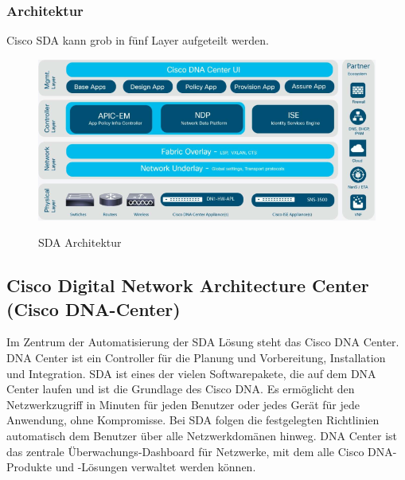 \subsubsection{Architektur}
Cisco SDA kann grob in fünf Layer aufgeteilt werden.
\begin{figure}[H]
	\centering
	\includegraphics[width=1\linewidth]{img/cisco-sda-architecture.png}\\[1px]
	\caption{SDA Architektur \cite{sda-whitepaper}}
	\label{fig:SDA Architektur}
\end{figure}


\subsection{Cisco Digital Network Architecture Center (Cisco DNA-Center)}
Im Zentrum der Automatisierung der SDA Lösung steht das Cisco DNA Center. DNA Center ist ein Controller für die Planung und Vorbereitung, Installation und Integration. SDA ist eines der vielen Softwarepakete, die auf dem DNA Center laufen und ist die Grundlage des Cisco DNA. Es ermöglicht den Netzwerkzugriff in Minuten für jeden Benutzer oder jedes Gerät für jede Anwendung, ohne Kompromisse. Bei SDA folgen die festgelegten Richtlinien automatisch dem Benutzer über alle Netzwerkdomänen hinweg.
DNA Center ist das zentrale Überwachungs-Dashboard für Netzwerke, mit dem alle Cisco DNA-Produkte und -Lösungen verwaltet werden können.

